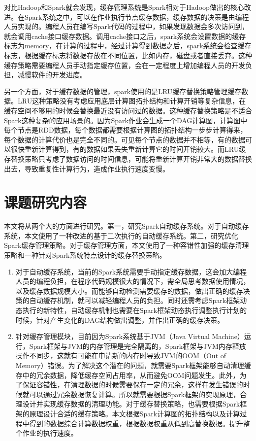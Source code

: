 对比Hadoop和Spark就会发现，缓存管理系统是Spark相对于Hadoop做出的核心改进。在Spark系统之中，可以在作业执行节点缓存数据，缓存数据的决策是由编程人员实现的。编程人员在编写Spark代码的过程中，如果发现数据会多次访问到，就会调用cache接口缓存数据。调用cache接口之后，spark系统会设置数据的缓存标志为memory，在计算的过程中，经过计算得到数据之后，spark系统会检查缓存标志，根据缓存标志将数据存放在不同位置，比如内存，磁盘或者直接丢弃。这种缓存策略需要编程人员手动指定缓存位置，会在一定程度上增加编程人员的开发负担，减慢软件的开发进度。

另一个方面，对于缓存数据的管理，spark使用的是LRU缓存替换策略管理缓存数据。LRU这种策略没有考虑应用底层计算图拓扑结构和计算开销等复杂信息，在缓存空间不够用的时候会替换最近没有访问过的数据。这种缓存替换策略是不适合Spark这种复杂的应用场景的。因为Spark作业会生成一个DAG计算图，计算图中每个节点是RDD数据，每个数据都需要根据计算图的拓扑结构一步步计算得来，每个数据的计算代价也是完全不同的。可见每个节点的数据并不相等，有的数据可以很快重新计算得到，有的数据如果丢失重新计算它的时间开销较大。而LRU缓存替换策略只考虑了数据访问的时间信息，可能将重新计算开销非常大的数据替换出去，导致重复性计算行为，造成作业执行速度变慢。

\section{课题研究内容}

本文将从两个大的方面进行研究。第一，研究Spark自动缓存系统。对于自动缓存系统，本文使用了一种改进的基于二次执行的自动缓存系统。第二，研究优化Spark缓存管理策略。对于缓存管理方面，本文使用了一种容错性加强的缓存清理策略和一种针对Spark系统特点设计的缓存替换策略。

\begin{enumerate}
    \item 对于自动缓存系统，当前的Spark系统需要手动指定缓存数据，这会加大编程人员的编程负担，在程序代码规模很大的情况下，需全局思考数据使用情况，以及缓存数据规模大小。而能够自动检测需要缓存的数据，做出正确的缓存决策的自动缓存机制，就可以减轻编程人员的负担。同时还需考虑Spark框架动态执行的新特性，自动缓存机制也需要在Spark框架动态执行调整执行计划的时候，针对产生变化的DAG结构做出调整，并作出正确的缓存决策。
    \item 针对缓存管理模块，目前因为Spark系统基于JVM（Java Virtual Machine）运行，Spark框架与JVM的内存管理是完全隔离的，Spark框架与JVM内存释放操作不同步，这就有可能在申请新的内存时导致JVM的OOM（Out of Memory）错误。为了解决这个潜在的问题，就需要Spark框架能够自动清理缓存中的冗余数据，降低缓存空间占用率，从而避免OOM问题发生。此外，为了保证容错性，在清理数据的时候需要保存一定的冗余，这样在发生错误的时候就可以通过冗余数据恢复计算。所以就需要根据Spark框架的实现原理，合理设计并实现缓存数据的清理功能。对于缓存替换策略，也需要根据Spark框架的原理设计合适的缓存策略。本文根据Spark计算图的拓扑结构以及计算过程中得到的数据综合计算数据权重，根据数据权重从低到高替换数据。提升整个作业的执行速度。
\end{enumerate}

